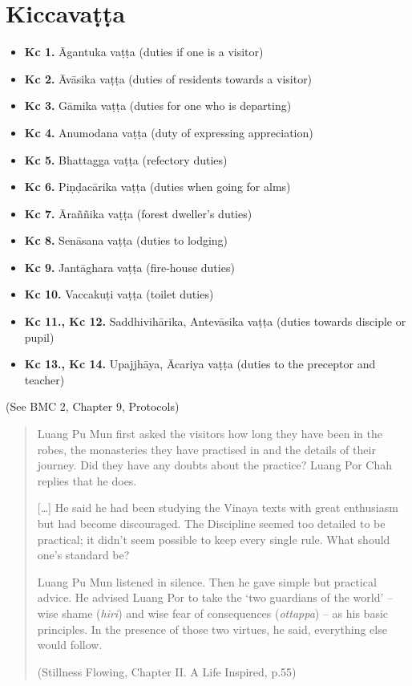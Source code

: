 \chapter{Kiccavaṭṭa}

\begin{itemize}
\tightlist
\item
  \textbf{Kc 1.} Āgantuka vaṭṭa (duties if one is a visitor)
\item
  \textbf{Kc 2.} Āvāsika vaṭṭa (duties of residents towards a visitor)
\item
  \textbf{Kc 3.} Gāmika vaṭṭa (duties for one who is departing)
\item
  \textbf{Kc 4.} Anumodana vaṭṭa (duty of expressing appreciation)
\item
  \textbf{Kc 5.} Bhattagga vaṭṭa (refectory duties)
\item
  \textbf{Kc 6.} Piṇḍacārika vaṭṭa (duties when going for alms)
\item
  \textbf{Kc 7.} Āraññika vaṭṭa (forest dweller's duties)
\item
  \textbf{Kc 8.} Senāsana vaṭṭa (duties to lodging)
\item
  \textbf{Kc 9.} Jantāghara vaṭṭa (fire-house duties)
\item
  \textbf{Kc 10.} Vaccakuṭi vaṭṭa (toilet duties)
\item
  \textbf{Kc 11., Kc 12.} Saddhivihārika, Antevāsika vaṭṭa (duties
  towards disciple or pupil)
\item
  \textbf{Kc 13., Kc 14.} Upajjhāya, Ācariya vaṭṭa (duties to the
  preceptor and teacher)
\end{itemize}

(See BMC 2, Chapter 9, Protocols)

\begin{quote}
Luang Pu Mun first asked the visitors how long they have been in the
robes, the monasteries they have practised in and the details of their
journey. Did they have any doubts about the practice? Luang Por Chah
replies that he does.

{[}\ldots{]} He said he had been studying the Vinaya texts with great
enthusiasm but had become discouraged. The Discipline seemed too
detailed to be practical; it didn't seem possible to keep every single
rule. What should one's standard be?

Luang Pu Mun listened in silence. Then he gave simple but practical
advice. He advised Luang Por to take the `two guardians of the world' --
wise shame (\emph{hiri}) and wise fear of consequences (\emph{ottappa})
-- as his basic principles. In the presence of those two virtues, he
said, everything else would follow.

(Stillness Flowing, Chapter II. A Life Inspired, p.55)
\end{quote}

